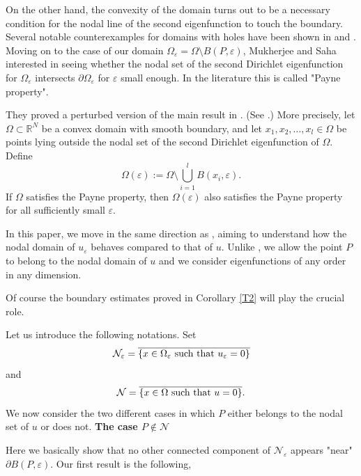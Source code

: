\documentclass[11pt,reqno]{article}
\numberwithin{equation}{section}
\newcommand\e\varepsilon
\renewcommand\O\Omega
\begin{document}
     On the other hand, the convexity of the domain turns out to be a necessary condition for the nodal line of the second eigenfunction to touch the boundary. Several notable counterexamples for domains with holes have been shown in \cite{MHTONN1997} and \cite{fl}. Moving on to the case of our domain $\O_\e=\O\setminus B(P,\e)$, Mukherjee and Saha \cite{MMSS2022} interested in seeing whether the nodal set of the second Dirichlet eigenfunction for $\O_\e$ intersects $\partial \O_\e$ for $\e$ small enough. In the literature this is called "Payne property". 
     
     They proved a perturbed version of the main result in \cite{melas1992}. (See  \cite[Proposition 4.2]{MMSS2022}.) More precisely, let $\Omega\subset\mathbb{R}^N$ be a convex domain with smooth boundary, and let $x_1,x_2,\ldots,x_l\in\Omega$ be points lying outside the nodal set of the second Dirichlet eigenfunction of $\Omega$. Define
\[
\Omega(\varepsilon):=\Omega\setminus\bigcup_{i=1}^l B(x_i,\varepsilon).
\]
If $\Omega$ satisfies the Payne property, then $\Omega(\varepsilon)$ also satisfies the Payne property for all sufficiently small $\varepsilon$.
     
In this paper, we move in the same direction as \cite{MMSS2022}, aiming to understand how the nodal domain of $u_\varepsilon$ behaves compared to that of $u$. Unlike \cite{MMSS2022}, we allow the point $P$ to belong to the nodal domain of $u$ and we consider eigenfunctions of any order in any dimension.

Of course the boundary estimates proved in Corollary \ref{T2} will play the crucial role.

Let us introduce the following notations.
Set
	\begin{equation}
		\mathcal{N_\e}=\overline{\{x\in\O_\e\hbox{ such that }u_\e=0\}}
	\end{equation}
	and 
	\begin{equation}
		\mathcal{N}=\overline{\{x\in\O\hbox{ such that }u=0\}}.
	\end{equation}
    We now consider the two different cases in which $P$ either belongs to the nodal set of $u$ or does not.
    \vskip0.2cm
{\bf The case $P\notin\mathcal{N}$}

Here we basically show that no other connected component of $\mathcal{N_\e}$ appears "near" $\partial B(P,\e)$. Our first result is the following,
\end{document}
